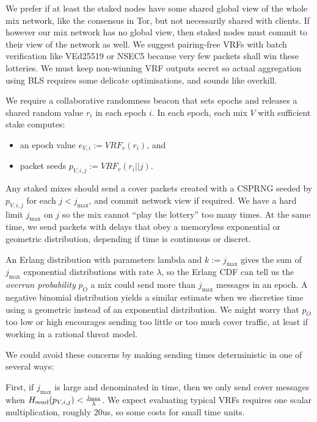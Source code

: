 ﻿\documentclass{sig-alternate-hotpets}
\newcommand{\microseconds}{us}
\begin{document}
We prefer if at least the staked nodes have some shared global view of the whole mix network, like the consensus in Tor, but not necessarily shared with clients.  If however our mix network has no global view, then staked nodes must commit to their view of the network as well.  We suggest pairing-free VRFs with batch verification like VEd25519 or NSEC5 because very few packets shall win these lotteries.  We must keep non-winning VRF outputs secret so actual aggregation using BLS requires some delicate optimisations, and sounds like overkill.

We require a collaborative randomness beacon that sets epochs and releases a shared random value $r_i$ in each epoch $i$.  In each epoch, each mix $V$ with sufficient stake computes:
\begin{itemize}
\item an epoch value $e_{V,i} := VRF_v(r_i)$, and
\item packet seeds $p_{V,i,j} := VRF_v(r_i || j)$.
\end{itemize}

Any staked mixes should send a cover packets created with a CSPRNG seeded by $p_{V,i,j}$ for each $j < j_{\max}$, and commit network view if required.  We have a hard limit $j_{\max}$ on $j$ so the mix cannot ``play the lottery'' too many times.  At the same time, we send packets with delays that obey a memoryless exponential or geometric distribution, depending if time is continuous or discret. 

An Erlang distribution with parameters lambda and $k := j_{\max}$ gives the sum of $j_{\max}$ exponential distributions with rate $\lambda$, so the Erlang CDF can tell us the {\em overrun probability} $p_O$ a mix could send more than $j_{\max}$ messages in an epoch.  A negative binomial distribution yields a similar estimate when we discretise time using a geometric instead of an exponential distribution.  We might worry that $p_O$ too low or high encourages sending too little or too much cover traffic, at least if working in a rational threat model.  

We could avoid these concerns by making sending times deterministic in
one of several ways:

First, if $j_{\max}$ is large and denominated in time, then we only send 
cover messages when $H_{\mathrm{send}}(p_{V,i,j}) < {j_{\max} \over \lambda}$. 
We expect evaluating typical VRFs requires one scalar multiplication,
roughly 20\microseconds, so some costs for small time units.
\end{document}
